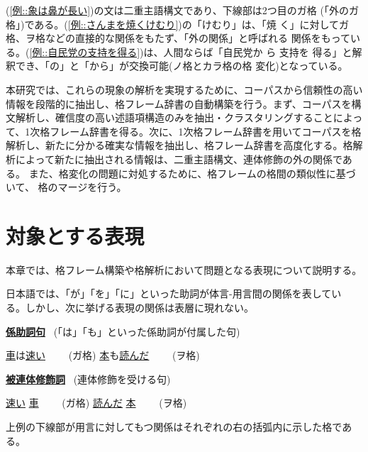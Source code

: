 \documentclass[fleqn]{nlp}
\begin{document}
\noindent
(\ref{例::象は鼻が長い})の文は二重主語構文であり、下線部は2つ目のガ格
(「外のガ格」)である。(\ref{例::さんまを焼くけむり})の「けむり」は、「焼
く」に対してガ格、ヲ格などの直接的な関係をもたず、「外の関係」と呼ばれる
関係をもっている。(\ref{例::自民党の支持を得る})は、人間ならば「自民党か
ら 支持を 得る」と解釈でき、「の」と「から」が交換可能(ノ格とカラ格の格
変化)となっている。

本研究では、これらの現象の解析を実現するために、コーパスから信頼性の高い
情報を段階的に抽出し、格フレーム辞書の自動構築を行う。まず、コーパスを構
文解析し、確信度の高い述語項構造のみを抽出・クラスタリングすることによっ
て、1次格フレーム辞書を得る。次に、1次格フレーム辞書を用いてコーパスを格
解析し、新たに分かる確実な情報を抽出し、格フレーム辞書を高度化する。格解
析によって新たに抽出される情報は、二重主語構文、連体修飾の外の関係である。
また、格変化の問題に対処するために、格フレームの格間の類似性に基づいて、
格のマージを行う。


\section{対象とする表現}
\label{章::日本語表現}

本章では、格フレーム構築や格解析において問題となる表現について説明する。

日本語では、「が」「を」「に」といった助詞が体言-用言間の関係を表してい
る。しかし、次に挙げる表現の関係は表層に現れない。

\vspace*{1ex}

\noindent
\underline{\textbf{係助詞句}} \ (「は」「も」といった係助詞が付属した句)

\begin{exe}
 \ex
 \begin{xlist}
  \ex \underline{車}は\underline{\underline{速い}} \ \ \ \ (ガ格)
  \ex \underline{本}も\underline{\underline{読んだ}} \ \ \ \ (ヲ格)
 \end{xlist}
\end{exe}

\noindent
\underline{\textbf{被連体修飾詞}} \ (連体修飾を受ける句)

\begin{exe}
 \ex
 \begin{xlist}
  \ex \underline{\underline{速い}} \underline{車} \ \ \ \ (ガ格)
  \ex \underline{\underline{読んだ}} \underline{本} \ \ \ \ (ヲ格)
 \end{xlist}
\end{exe}
上例の下線部が用言に対してもつ関係はそれぞれの右の括弧内に示した格である。
\end{document}
